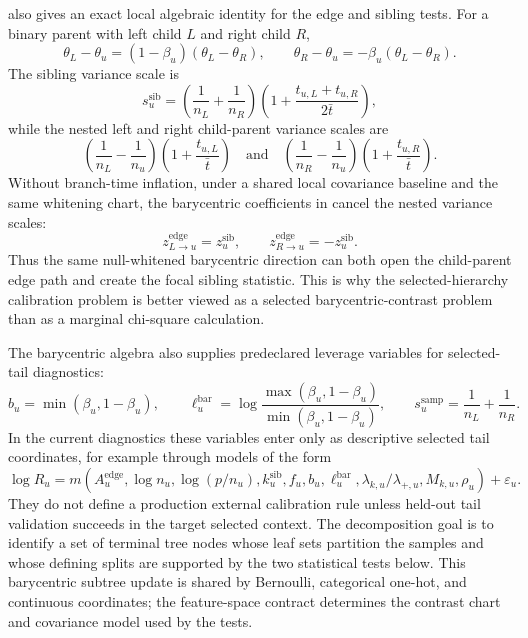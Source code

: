  also gives an exact local algebraic identity for
the edge and sibling tests. For a binary parent with left child $L$ and right
child $R$,
\begin{equation}
\theta_L-\theta_u
=
(1-\beta_u)(\theta_L-\theta_R),
\qquad
\theta_R-\theta_u
=
-\beta_u(\theta_L-\theta_R).
\label{eq:barycentric-raw-contrasts}
\end{equation}
The sibling variance scale is
\[
s_u^{\mathrm{sib}}
=
\left(\frac{1}{n_L}+\frac{1}{n_R}\right)
\left(1+\frac{t_{u,L}+t_{u,R}}{2\bar t}\right),
\]
while the nested left and right child-parent variance scales are
\[
\left(\frac{1}{n_L}-\frac{1}{n_u}\right)
\left(1+\frac{t_{u,L}}{\bar t}\right)
\quad\text{and}\quad
\left(\frac{1}{n_R}-\frac{1}{n_u}\right)
\left(1+\frac{t_{u,R}}{\bar t}\right).
\]
Without branch-time inflation, under a shared local covariance baseline and the
same whitening chart, the barycentric coefficients in
 cancel the nested variance scales:
\begin{equation}
z_{L\to u}^{\mathrm{edge}} = z_u^{\mathrm{sib}},
\qquad
z_{R\to u}^{\mathrm{edge}} = -z_u^{\mathrm{sib}}.
\label{eq:barycentric-edge-sibling-identity}
\end{equation}
Thus the same null-whitened barycentric direction can both open the
child-parent edge path and create the focal sibling statistic. This is why the
selected-hierarchy calibration problem is better viewed as a selected
barycentric-contrast problem than as a marginal chi-square calculation.

The barycentric algebra also supplies predeclared leverage variables for
selected-tail diagnostics:
\begin{equation}
b_u=\min(\beta_u,1-\beta_u),
\qquad
\ell_u^{\mathrm{bar}}
=
\log\frac{\max(\beta_u,1-\beta_u)}{\min(\beta_u,1-\beta_u)},
\qquad
s_u^{\mathrm{samp}}=\frac{1}{n_L}+\frac{1}{n_R}.
\end{equation}
In the current diagnostics these variables enter only as descriptive selected
tail coordinates, for example through models of the form
\begin{equation}
\log R_u
=
m\!\left(
A_u^{\mathrm{edge}},
\log n_u,
\log(p/n_u),
k_u^{\mathrm{sib}},
f_u,
b_u,
\ell_u^{\mathrm{bar}},
\lambda_{k,u}/\lambda_{+,u},
M_{k,u},
\rho_u
\right)
+
\varepsilon_u.
\end{equation}
They do not define a production external calibration rule unless held-out tail
validation succeeds in the target selected context.
The decomposition goal is to identify a set of terminal tree nodes whose leaf
sets partition the samples and whose defining splits are supported by the two
statistical tests below. This barycentric subtree update is shared by
Bernoulli, categorical one-hot, and continuous coordinates; the feature-space
contract determines the contrast chart and covariance model used by the tests.


